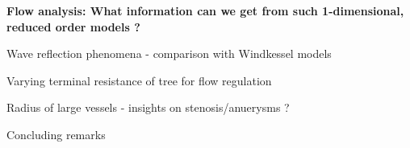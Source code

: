 \documentclass{beamer}
\begin{document}
\begin{frame}
	\begin{center}
		\Large{\textbf{Flow analysis: What information can we get from such 1-dimensional, reduced order models ?}}
	\end{center}
\end{frame}

\begin{frame}{Wave reflection phenomena - comparison with Windkessel models}

\end{frame}

\begin{frame}{Varying terminal resistance of tree for flow regulation}

\end{frame}

\begin{frame}{Radius of large vessels - insights on stenosis/anuerysms ?}

\end{frame}

\begin{frame}{Concluding remarks}

\end{frame}
\end{document}
